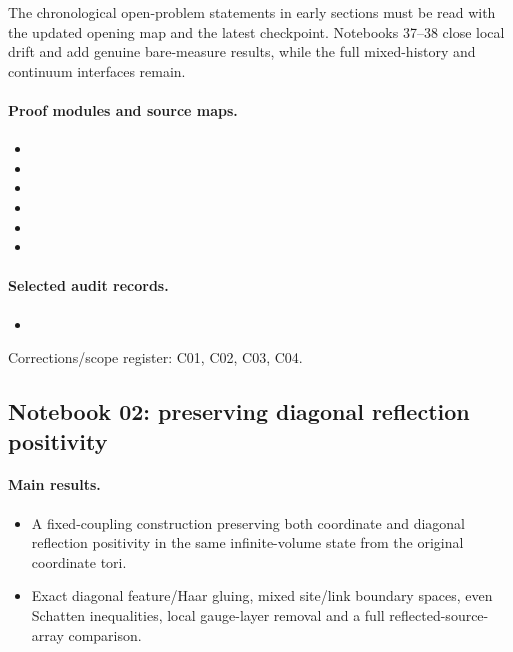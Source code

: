 \documentclass[11pt]{article}
\theoremstyle{remark}
\begin{document}
The chronological open-problem statements in early sections must be read with the updated opening map and the latest checkpoint. Notebooks 37--38 close local drift and add genuine bare-measure results, while the full mixed-history and continuum interfaces remain.

\paragraph{Proof modules and source maps.}
\begingroup\small
\begin{itemize}
\item {}
\item {}
\item {}
\item {}
\item {}
\item {}
\end{itemize}
\endgroup

\paragraph{Selected audit records.}
\begingroup\small
\begin{itemize}
\item {}
\end{itemize}
\endgroup
Corrections/scope register: C01, C02, C03, C04.\par

\subsection{Notebook 02: preserving diagonal reflection positivity}
\label{hnc-02}
\noindent{}\par

\paragraph{Main results.}
\begin{itemize}
\item A fixed-coupling construction preserving both coordinate and diagonal reflection positivity in the same infinite-volume state from the original coordinate tori.
\item Exact diagonal feature/Haar gluing, mixed site/link boundary spaces, even Schatten inequalities, local gauge-layer removal and a full reflected-source-array comparison.
\end{itemize}
\end{document}
